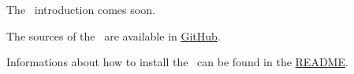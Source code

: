 %



%

The \pkg\ introduction comes soon.

The sources of the \pkg\ are available in \href{https://github.com/test-fullautomation/robotframework-dbus}{GitHub}.

Informations about how to install the \pkg\ can be found in the \href{https://github.com/test-fullautomation/robotframework-dbus/blob/develop/README.rst}{README}.

